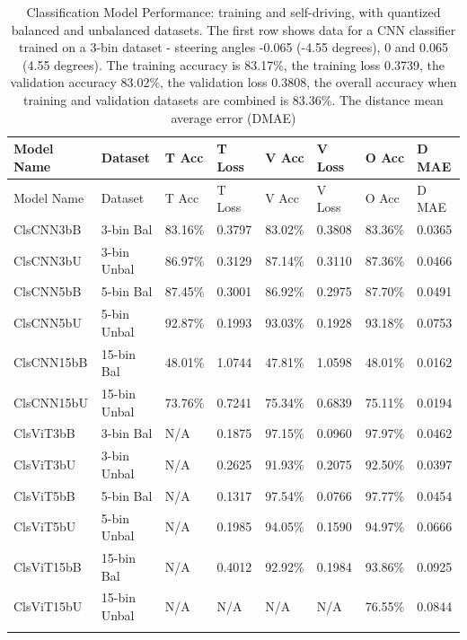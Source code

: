 \begin{longtable}{@{}llllllll@{}}
\toprule
Model Name & Dataset & T Acc & T Loss & V Acc & V Loss & O Acc & D MAE \\
\midrule
\endfirsthead
\toprule
Model Name & Dataset & T Acc & T Loss & V Acc & V Loss & O Acc & D MAE \\
\midrule
\endhead
ClsCNN3bB & 3-bin Bal & 83.16\% & 0.3797 & 83.02\% & 0.3808 & 83.36\% & 0.0365 \\
ClsCNN3bU & 3-bin Unbal & 86.97\% & 0.3129 & 87.14\% & 0.3110 & 87.36\% & 0.0466 \\
ClsCNN5bB & 5-bin Bal & 87.45\% & 0.3001 & 86.92\% & 0.2975 & 87.70\% & 0.0491 \\
ClsCNN5bU & 5-bin Unbal & 92.87\% & 0.1993 & 93.03\% & 0.1928 & 93.18\% & 0.0753 \\
ClsCNN15bB & 15-bin Bal & 48.01\% & 1.0744 & 47.81\% & 1.0598 & 48.01\% & 0.0162 \\
ClsCNN15bU & 15-bin Unbal & 73.76\% & 0.7241 & 75.34\% & 0.6839 & 75.11\% & 0.0194 \\
ClsViT3bB & 3-bin Bal & N/A & 0.1875 & 97.15\% & 0.0960 & 97.97\% & 0.0462 \\
ClsViT3bU & 3-bin Unbal & N/A & 0.2625 & 91.93\% & 0.2075 & 92.50\% & 0.0397 \\
ClsViT5bB & 5-bin Bal & N/A & 0.1317 & 97.54\% & 0.0766 & 97.77\% & 0.0454 \\
ClsViT5bU & 5-bin Unbal & N/A & 0.1985 & 94.05\% & 0.1590 & 94.97\% & 0.0666 \\
ClsViT15bB & 15-bin Bal & N/A & 0.4012 & 92.92\% & 0.1984 & 93.86\% & 0.0925 \\
ClsViT15bU & 15-bin Unbal & N/A & N/A & N/A & N/A & 76.55\% & 0.0844 \\
\bottomrule
\caption{Classification Model Performance: training and self-driving, with quantized balanced and unbalanced datasets. The first row shows data for a CNN classifier trained on a 3-bin dataset - steering angles -0.065 (-4.55 degrees), 0 and 0.065 (4.55 degrees). The training accuracy is 83.17\%, the training loss 0.3739, the validation accuracy 83.02\%, the validation loss 0.3808, the overall accuracy when training and validation datasets are combined is 83.36\%. The distance mean average error (DMAE)}
\label{results:classifier_models_results_table}
\end{longtable}

